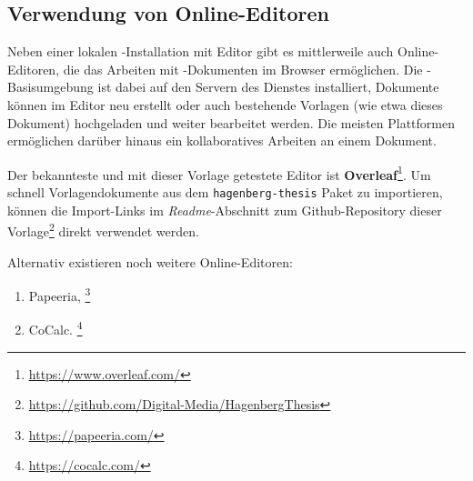 \subsection{Verwendung von Online-Editoren}

Neben einer lokalen \latex-Installation mit Editor gibt es mittlerweile auch Online-Editoren, die das Arbeiten mit \latex-Dokumenten
im Browser ermöglichen. Die \latex-Basisumgebung ist dabei auf den Servern des Dienstes installiert, Dokumente können im Editor neu
erstellt oder auch bestehende Vorlagen (wie etwa dieses Dokument) hochgeladen und weiter bearbeitet werden. Die meisten Plattformen
ermöglichen darüber hinaus ein kollaboratives Arbeiten an einem Dokument.

Der bekannteste und mit dieser Vorlage getestete Editor ist \textbf{Overleaf}\footnote{\url{https://www.overleaf.com/}}. Um schnell
Vorlagendokumente aus dem \texttt{hagenberg-thesis} Paket zu importieren, können die Import-Links im \emph{Readme}-Abschnitt zum Github-Repository
dieser Vorlage\footnote{\url{https://github.com/Digital-Media/HagenbergThesis}} direkt verwendet werden.

Alternativ existieren noch weitere Online-Editoren:
%
\begin{enumerate}
	\item Papeeria,%
	\footnote{\url{https://papeeria.com/}}
	\item CoCalc.%
	\footnote{\url{https://cocalc.com/}}
\end{enumerate}
